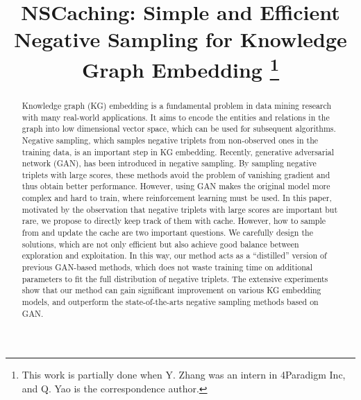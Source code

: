\documentclass[conference]{IEEEtran}
\begin{document}
\title{NSCaching: Simple and Efficient Negative Sampling for Knowledge Graph Embedding
\thanks{This work is partially done when Y. Zhang was an intern in 4Paradigm Inc,
	and Q. Yao is the correspondence author.}
}


\author{
	}


\maketitle




\begin{abstract}
Knowledge graph (KG) embedding is a fundamental problem in data mining research with many real-world applications.
It aims to encode the entities and relations in the graph into low dimensional vector space,
which can be used for subsequent algorithms.
Negative sampling,
which samples negative triplets from non-observed ones in the training data, 
is an important step in KG embedding.
Recently,
generative adversarial network (GAN),
has been introduced in negative sampling.
By sampling negative triplets with large scores,
these methods avoid the problem of vanishing gradient and thus obtain better performance.
However,
using GAN makes the original model more complex and hard to train,
where reinforcement learning must be used.
In this paper,
motivated by the observation that negative triplets with large scores are important but rare,
we propose to directly keep track of them with cache.
However,
how to sample from and update the cache are two important questions.
We carefully design the solutions,
which are not only efficient but also achieve good balance between exploration and exploitation.
In this way,
our method acts as a ``distilled'' version of previous GAN-based methods,
which does not waste training time on additional parameters to fit the full distribution of negative triplets.
The extensive experiments show that 
our method can gain significant improvement on various KG embedding models, 
and outperform the state-of-the-arts negative sampling methods based on GAN.
\end{abstract}
\end{document}
